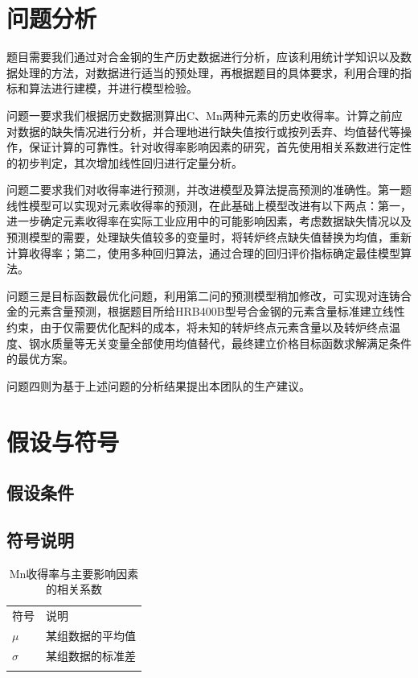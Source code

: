 \documentclass{xcumcmart}
\begin{document}
\section{问题分析}
\par 题目需要我们通过对合金钢的生产历史数据进行分析，应该利用统计学知识以及数据处理的方法，对数据进行适当的预处理，再根据题目的具体要求，利用合理的指标和算法进行建模，并进行模型检验。
\par 问题一要求我们根据历史数据测算出C、Mn两种元素的历史收得率。计算之前应对数据的缺失情况进行分析，并合理地进行缺失值按行或按列丢弃、均值替代等操作，保证计算的可靠性。针对收得率影响因素的研究，首先使用相关系数进行定性的初步判定，其次增加线性回归进行定量分析。
\par 问题二要求我们对收得率进行预测，并改进模型及算法提高预测的准确性。第一题线性模型可以实现对元素收得率的预测，在此基础上模型改进有以下两点：第一，进一步确定元素收得率在实际工业应用中的可能影响因素，考虑数据缺失情况以及预测模型的需要，处理缺失值较多的变量时，将转炉终点缺失值替换为均值，重新计算收得率；第二，使用多种回归算法，通过合理的回归评价指标确定最佳模型算法。
\par 问题三是目标函数最优化问题，利用第二问的预测模型稍加修改，可实现对连铸合金的元素含量预测，根据题目所给HRB400B型号合金钢的元素含量标准建立线性约束，由于仅需要优化配料的成本，将未知的转炉终点元素含量以及转炉终点温度、钢水质量等无关变量全部使用均值替代，最终建立价格目标函数求解满足条件的最优方案。
\par 问题四则为基于上述问题的分析结果提出本团队的生产建议。

\section{假设与符号}
\subsection{假设条件}
\subsection{符号说明}
\begin{table}[htbp]
	\centering
	\begin{tabu}{l l}
		\tabucline[1.5pt]{-}
		符号 & 说明\\
		\tabucline[1.5pt]{-}
		$\mu$ & 某组数据的平均值\\
		$\sigma$ & 某组数据的标准差\\
		\tabucline[1.5pt]{-}
	\end{tabu}
	\caption{Mn收得率与主要影响因素的相关系数\label{tb:tbs2}}
\end{table}
\end{document}
